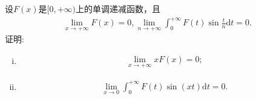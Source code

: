 \documentclass[../../main.tex]{subfiles}
\begin{document}
\begin{example}
设$F(x)$是$[0,+\infty)$上的单调递减函数，且
\begin{align}
\lim\limits_{x \to +\infty} F(x) = 0,
\lim\limits_{n \to +\infty} \int_0^{+\infty} F(t) \sin \frac{t}{n} \mathrm{d}t = 0.\label{eq::23945789023589028225}
\end{align}
证明:
\begin{enumerate}[(i)]
\item \begin{align}
\lim\limits_{x \to +\infty} xF(x) = 0;\label{eq::23945789023589028226}
\end{align}

\item \begin{align}
\lim\limits_{x \to 0} \int_0^{+\infty} F(t) \sin(xt) \mathrm{d}t = 0.\label{eq::23945789023589028227}
\end{align}
\end{enumerate}
\end{example}
\end{document}

